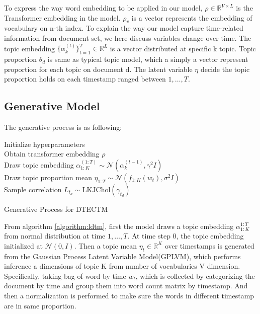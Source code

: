 To express the way word embedding to be applied in our model, $ \rho\in\mathbb{R}^{V\times L} $ is the Transformer embedding in the model. $ \rho_v $ is a vector represents the embedding of vocabulary on n-th index.
To explain the way our model capture time-related information from document set, we here discuss variables change over time. The topic embedding $ \{\alpha^{(t)}_k\}^{T}_{t=1}\in\mathbb{R}^{L} $ is a vector distributed at specific k topic.
Topic proportion $ \theta_d $ is same as typical topic model, which a simply a vector represent proportion for each topic on document d.
The latent variable $ \eta $ decide the topic proportion holds on each timestamp ranged between $ 1, \dots, T $. 
\subsection{Generative Model}
The generative process is as following:\\
\begin{algorithm}[H]
Initialize hyperparameters\\
Obtain transformer embedding $ \rho $\\
Draw topic embedding $ \alpha_{1:K}^{(1:T)}\sim\mathcal{N}(\alpha_k^{(t-1)},\gamma^2I) $\\
Draw topic proportion mean $ \eta_{1:T}\sim\mathcal{N}(f_{1:K}(w_t),\sigma^2I) $\\
Sample correlation $ L_{t_d}\sim \text{LKJChol}(\gamma_{t_d})$\\
\caption{Generative Process for DTECTM}
\label{algorithm:ldtm}
\end{algorithm}
From algorithm \ref{algorithm:ldtm}, first the model draws a topic embedding $ \alpha_{1:K}^{1:T} $ from normal distribution at time $ 1,\dots,T $. At time step 0, the topic embedding initialized at $ \mathcal{N}(0,I) $.
Then a topic mean $ \eta_t\in\mathbb{R}^{K} $ over timestamps is generated from the Gaussian Process Latent Variable Model(GPLVM), which performs inference a dimensions of topic K from number of vocabularies V dimension. Specifically, taking bag-of-word by time $ w_t $, which is collected by categorizing the document by time and group them into word count matrix by timestamp. And then a normalization is performed to make sure the words in different timestamp are in same proportion.
